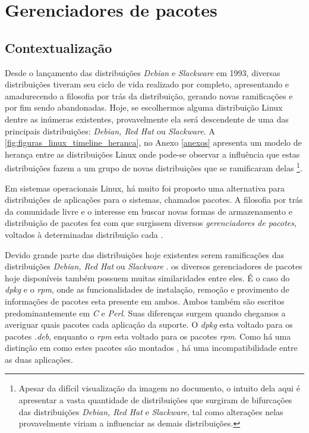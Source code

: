 \section{Gerenciadores de pacotes} %
\label{sec:distribui_es_abordadas}

\subsection{Contextualização} %
\label{sec:breve_descri_o}

Desde o lançamento das distribuições \textit{Debian} e \textit{Slackware} em 1993, diversas distribuições tiveram seu ciclo de vida realizado por completo, apresentando e amadurecendo a filosofia por trás da distribuição, gerando novas ramificações e por fim sendo abandonadas. Hoje, se escolhermos alguma distribuição Linux dentre as inúmeras existentes, provavelmente ela será descendente de uma das principais distribuições: \textit{Debian, Red Hat} ou \textit{Slackware}. %
A \autoref{fig:figuras_linux_timeline_heranca}, no Anexo \ref{anexos} apresenta um modelo de herança entre as distribuições Linux onde pode-se observar a influência que estas distribuições fazem a um grupo de novas distribuições que se ramificaram delas%
\footnote{Apesar da difícil visualização da imagem no documento, o intuito dela aqui é apresentar a vasta quantidade de distribuições que surgiram de bifurcações das distribuições \textit{Debian, Red Hat} e \textit{Slackware}, tal como alterações nelas provavelmente viriam a influenciar as demais distribuições.}.

Em sistemas operacionais Linux, há muito foi proposto uma alternativa para distribuições de aplicações para o sistemas, chamados pacotes. A filosofia por trás da comunidade livre \cite{bretthauer2001open} e o interesse em buscar novas formas de armazenamento e distribuição de pacotes fez com que surgissem diversos \textit{gerenciadores de pacotes}, voltados à determinadas distribuição  cada \cite{beck2002linux}.

Devido grande parte das distribuições hoje existentes serem ramificações das distribuições \textit{Debian, Red Hat} ou \textit{Slackware} 
.%
os diversos gerenciadores de pacotes hoje disponíveis também possuem muitas similaridades entre eles.
É o caso do \textit{dpkg} e o \textit{rpm}, onde as funcionalidades de instalação, remoção e provimento de informações de pacotes esta presente em ambos. Ambos também são escritos predominantemente em \textit{C} e \textit{Perl}. Suas diferenças surgem quando chegamos a averiguar quais pacotes cada aplicação da suporte. O \textit{dpkg} esta voltado para os pacotes \textit{.deb}, enquanto o \textit{rpm} esta voltado para os pacotes \textit{rpm}. Como há uma distinção em como estes pacotes são montados \cite{bailey1997maximum}, há uma incompatibilidade entre as duas aplicações. 

